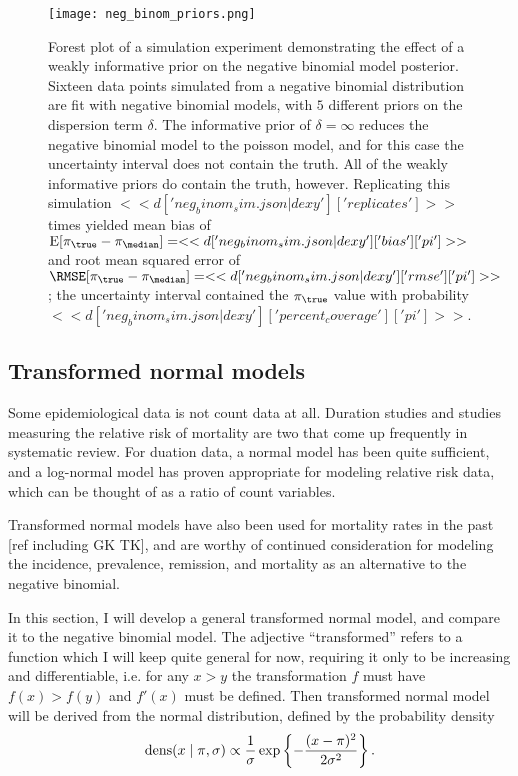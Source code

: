 \begin{figure}
\begin{center}
\texttt{[image: neg\_binom\_priors.png]}
\end{center}
\caption{Forest plot of a simulation experiment demonstrating the
  effect of a weakly informative prior on the negative binomial model
  posterior.  Sixteen data points simulated from a negative binomial
  distribution are fit with negative binomial models, with $5$
  different priors on the dispersion term $\delta$.  The informative
  prior of $\delta = \infty$ reduces the negative binomial model to
  the poisson model, and for this case the uncertainty interval does
  not contain the truth.  All of the weakly informative priors do
  contain the truth, however.  Replicating this simulation
  $<<d['neg_binom_sim.json|dexy']['replicates']>>$ times yielded mean
  bias of
  $\E[\pi_{\true}-\pi_{\median}]=<<d['neg_binom_sim.json|dexy']['bias']['pi']>>$
  and root mean squared error of
  $\RMSE[\pi_{\true}-\pi_{\median}]=<<d['neg_binom_sim.json|dexy']['rmse']['pi']>>$;
  the uncertainty interval contained the $\pi_{\true}$ value with probability
  $<<d['neg_binom_sim.json|dexy']['percent_coverage']['pi']>>$.}
\label{fig:theory-rate_model-neg_binom_priors}
\end{figure}

\subsection{Transformed normal models}
\label{transformed-normal-models}
Some epidemiological data is not count data at all.  Duration studies
and studies measuring the relative risk of mortality are two that come
up frequently in systematic review.  For duation data, a normal model
has been quite sufficient, and a log-normal model has proven
appropriate for modeling relative risk data, which can be thought of
as a ratio of count variables.

Transformed normal models have also been used for mortality rates in
the past [ref including GK TK], and are worthy of continued consideration for
modeling the incidence, prevalence, remission, and mortality as an
alternative to the negative binomial.

In this section, I will develop a general transformed normal model,
and compare it to the negative binomial model.  The adjective
``transformed'' refers to a function which I will keep quite general
for now, requiring it only to be increasing and differentiable,
i.e. for any $x > y$ the transformation $f$ must have $f(x) > f(y)$
and $f'(x)$ must be defined.  Then transformed normal model will be
derived from the normal distribution, defined by the probability
density
\[
\operatorname{dens}(x\;|\; \pi, \sigma) \propto \frac{1}{\sigma} \exp\left\{ -\frac{(x-\pi)^2}{2\sigma^2} \right\}.
\]

